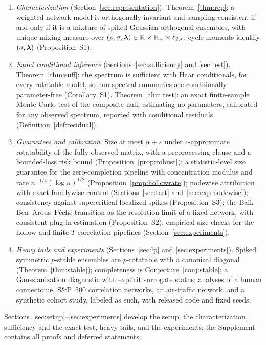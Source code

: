 \begin{enumerate}[leftmargin=1.7em,itemsep=0.1em]
\item \emph{Characterization} (Section~\ref{sec:representation}).
Theorem~\ref{thm:rep}: a weighted network model is orthogonally
invariant and sampling-consistent if and only if it is a mixture of
spiked Gaussian orthogonal ensembles, with unique mixing measure over
$(\rho,\sigma,\bm{\lambda})\in\mathbb{R}\times\mathbb{R}_{+}\times\ell_{2,*}$; cycle moments
identify $(\sigma,\bm{\lambda})$ (Proposition~S1).
\item \emph{Exact conditional inference} (Sections~\ref{sec:sufficiency}
and \ref{sec:test}). Theorem~\ref{thm:suff}: the spectrum is sufficient
with Haar conditionals, for every rotatable model, so non-spectral
summaries are conditionally parameter-free (Corollary~S1).
Theorem~\ref{thm:test}: an exact finite-sample Monte Carlo test of the
composite null, estimating no parameters, calibrated for any observed
spectrum, reported with conditional residuals
(Definition~\ref{def:residual}).
\item \emph{Guarantees and calibration}. Size at most
$\alpha+\varepsilon$ under $\varepsilon$-approximate rotatability of
the fully observed matrix, with a preprocessing clause and a
bounded-loss risk bound (Proposition~\ref{prop:robust}); a
statistic-level size guarantee for the zero-completion pipeline with
concentration modulus and rate $n^{-1/4}(\log n)^{1/2}$
(Proposition~\ref{prop:hollowrate}); nodewise attribution with exact
familywise control (Sections~\ref{sec:test}
and~\ref{sec:exp-nodewise}); consistency
against supercritical localized spikes (Proposition~S3); the
Baik--Ben~Arous--P\'ech\'e transition as the resolution limit of a
fixed network, with consistent plug-in estimation (Proposition~S2);
empirical size checks for the hollow and finite-$T$ correlation
pipelines (Section~\ref{sec:experiments}).
\item \emph{Heavy tails and experiments} (Sections~\ref{sec:lp} and
\ref{sec:experiments}). Spiked symmetric $p$-stable ensembles are
$p$-rotatable with a canonical diagonal (Theorem~\ref{thm:stable});
completeness is Conjecture~\ref{conj:stable}; a Gaussianization
diagnostic with explicit surrogate status; analyses of a human
connectome, S\&P~500 correlation networks, an air-traffic network, and
a synthetic cohort study, labeled as such, with released code and fixed
seeds.
\end{enumerate}

Sections~\ref{sec:setup}--\ref{sec:experiments} develop the setup,
the characterization, sufficiency and the exact test, heavy tails, and
the experiments; the Supplement contains all proofs and deferred
statements.


